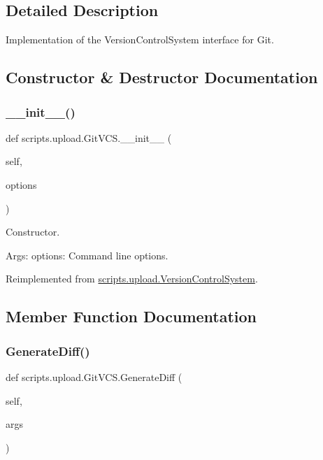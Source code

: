 \subsection{Detailed Description}
\begin{DoxyVerb}Implementation of the VersionControlSystem interface for Git.\end{DoxyVerb}
 

\subsection{Constructor \& Destructor Documentation}
\mbox{\label{classscripts_1_1upload_1_1_git_v_c_s_a79253ecc9f86353a766adc8c8c959f29}} 
\subsubsection{\texorpdfstring{\_\_init\_\_()}{\_\_init\_\_()}}
{\footnotesize\ttfamily def scripts.\+upload.\+Git\+V\+C\+S.\+\_\+\+\_\+init\+\_\+\+\_\+ (\begin{DoxyParamCaption}\item[{}]{self,  }\item[{}]{options }\end{DoxyParamCaption})}

\begin{DoxyVerb}Constructor.

Args:
  options: Command line options.
\end{DoxyVerb}
 

Reimplemented from \mbox{\hyperlink{classscripts_1_1upload_1_1_version_control_system_af9abfef93ba0921f6c63b51309c8d711}{scripts.\+upload.\+Version\+Control\+System}}.



\subsection{Member Function Documentation}
\mbox{\label{classscripts_1_1upload_1_1_git_v_c_s_abb1b442ca3cf81472388afa047932b7c}} 
\subsubsection{\texorpdfstring{GenerateDiff()}{GenerateDiff()}}
{\footnotesize\ttfamily def scripts.\+upload.\+Git\+V\+C\+S.\+Generate\+Diff (\begin{DoxyParamCaption}\item[{}]{self,  }\item[{}]{args }\end{DoxyParamCaption})}

